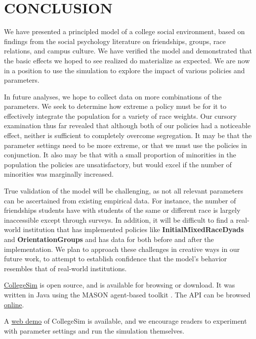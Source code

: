 
\section{CONCLUSION}
\label{sec:discussion}

We have presented a principled model of a college social environment, based on
findings from the social psychology literature on friendships, groups, race
relations, and campus culture. We have verified the model and demonstrated
that the basic effects we hoped to see realized do materialize as expected. We
are now in a position to use the simulation to explore the impact of various
policies and parameters.

In future analyses, we hope to collect data on more combinations of the
parameters. We seek to determine how extreme a policy must be for it to
effectively integrate the population for a variety of race weights. Our
cursory examination thus far revealed that although both of our policies had a
noticeable effect, neither is sufficient to completely overcome segregation.
It may be that the parameter settings need to be more extreme, or that we must
use the policies in conjunction. It also may be that with a small proportion
of minorities in the population the policies are unsatisfactory, but would
excel if the number of minorities was marginally increased. 

True validation of the model will be challenging, as not all relevant
parameters can be ascertained from existing empirical data. For instance, the
number of friendships students have with students of the same or different
race is largely inaccessible except through surveys. In addition, it will be
difficult to find a real-world institution that has implemented policies like
\textbf{InitialMixedRaceDyads} and \textbf{OrientationGroups} and has data for
both before and after the implementation. We plan to approach these challenges
in creative ways in our future work, to attempt to establish confidence that
the model's behavior resembles that of real-world institutions.

\href{https://github.com/WheezePuppet/CollegeSim}{CollegeSim} is open source, and is available for browsing or download. It was written in Java
using the MASON agent-based toolkit \cite{luke_mason:_2005}. The API can be
browsed \href{http://rosemary.umw.edu/~stephen/CollegeSimJavaDoc}{online}.

A \href{http://caladan.umw.edu:22223}{web demo} of CollegeSim is available, and we encourage readers to experiment
with parameter settings and run the simulation themselves.

